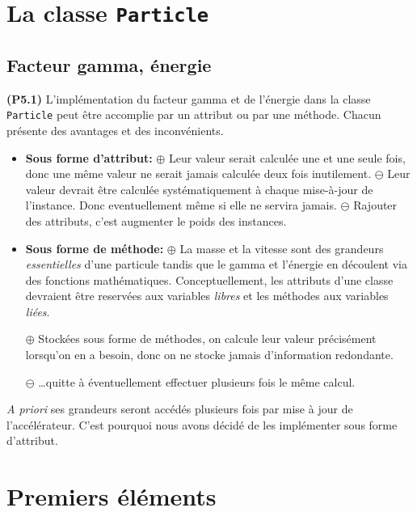 \documentclass[12pt, letterpaper, twoside]{article}
\newcommand{\T}[1]{\texttt{#1}}
\begin{document}
\section{La classe \T{Particle}}

\subsection{Facteur gamma, énergie}
\noindent \textbf{(P5.1)}
L'implémentation du facteur gamma et de l'énergie dans la classe \T{Particle} peut être accomplie par un attribut ou par une méthode. Chacun présente des avantages et des inconvénients.

\begin{itemize}

\item \textbf{Sous forme d'attribut:}
\subitem $\oplus$ Leur valeur serait calculée une et une seule fois, donc une même valeur ne serait jamais calculée deux fois inutilement.
\subitem $\ominus$ Leur valeur devrait être calculée systématiquement à chaque mise-à-jour de l'instance. Donc eventuellement même si elle ne servira jamais.
\subitem $\ominus$ Rajouter des attributs, c'est augmenter le poids des instances.

\item \textbf{Sous forme de méthode:}
\subitem $\oplus$ La masse et la vitesse sont des grandeurs \textit{essentielles} d'une particule tandis que le gamma et l'énergie en découlent via des fonctions mathématiques. Conceptuellement, les attributs d'une classe devraient être reservées aux variables \textit{libres} et les méthodes aux variables \textit{liées}.

\subitem $\oplus$ Stockées sous forme de méthodes, on calcule leur valeur précisément lorsqu'on en a besoin, donc on ne stocke jamais d'information redondante.

\subitem $\ominus$ \ldots quitte à éventuellement effectuer plusieurs fois le même calcul.
\end{itemize}
\bigskip
\textit{A priori} ses grandeurs seront accédés plusieurs fois par mise à jour de l'accélérateur. C'est pourquoi nous avons décidé de les implémenter sous forme d'attribut.

\section{Premiers éléments}
\end{document}
